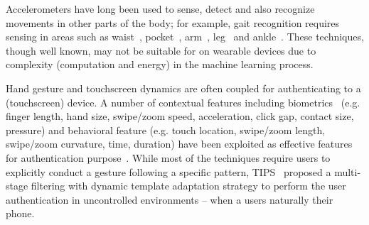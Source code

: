 Accelerometers have long been used to sense, detect and also recognize
movements in other parts of the body; for example, gait recognition requires
sensing in areas such as waist~\cite{ailisto2005identifying},
pocket~\cite{gafurov2007gait}, arm~\cite{okumura2006study,gafurov2008arm},
leg~\cite{gafurov2006biometric} and ankle~\cite{gafurov2011user}.
These techniques, though well known, may not be suitable for on wearable
devices due to complexity (computation and energy) in the machine learning
process.

Hand gesture and touchscreen dynamics are often coupled for
authenticating to a (touchscreen) device. A number of contextual features
including biometrics~\cite{sae2012biometric} (e.g. finger length, hand size,
swipe/zoom speed, acceleration, click gap, contact size, pressure)
and behavioral feature (e.g. touch location,
swipe/zoom length,
swipe/zoom curvature, time, duration) have been exploited as
effective features for authentication
purpose~\cite{frank2013touchalytics,cai2013mobile,feng2014tips}.
While most of the techniques require users to explicitly conduct a
gesture following a specific pattern, TIPS~\cite{feng2014tips}
proposed a multi-stage filtering with dynamic template adaptation
strategy to perform the user authentication in uncontrolled
environments -- when a users naturally their phone.




